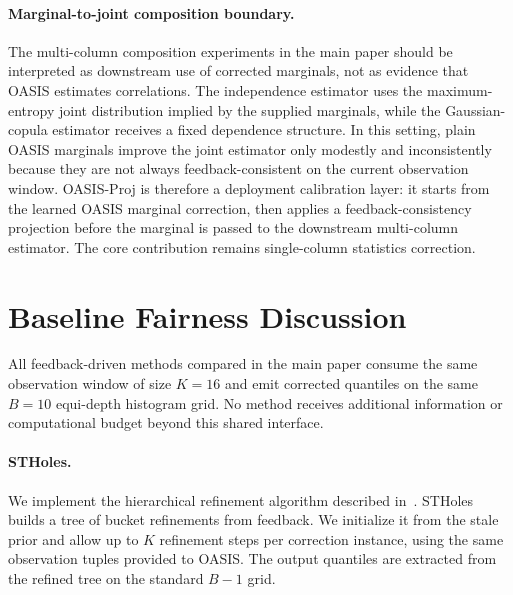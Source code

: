 \documentclass[runningheads]{llncs}
\begin{document}
\paragraph{Marginal-to-joint composition boundary.}
The multi-column composition experiments in the main paper should be interpreted
as downstream use of corrected marginals, not as evidence that OASIS estimates
correlations. The independence estimator uses the maximum-entropy joint
distribution implied by the supplied marginals, while the Gaussian-copula
estimator receives a fixed dependence structure. In this setting, plain OASIS
marginals improve the joint estimator only modestly and inconsistently because
they are not always feedback-consistent on the current observation window.
OASIS-Proj is therefore a deployment calibration layer: it starts from the
learned OASIS marginal correction, then applies a feedback-consistency
projection before the marginal is passed to the downstream multi-column
estimator. The core contribution remains single-column statistics correction.




\section{Baseline Fairness Discussion}
\label{sec:baseline-fairness}

All feedback-driven methods compared in the main paper consume the same
observation window of size $K{=}16$ and emit corrected quantiles on the same
$B{=}10$ equi-depth histogram grid. No method receives additional information
or computational budget beyond this shared interface.

\paragraph{STHoles.}
We implement the hierarchical refinement algorithm described
in~\cite{bruno2001stholes}. STHoles builds a tree of bucket refinements from
feedback. We initialize it from the stale prior and allow up to $K$ refinement
steps per correction instance, using the same observation tuples provided to
OASIS. The output quantiles are extracted from the refined tree on the standard
$B{-}1$ grid.
\end{document}
